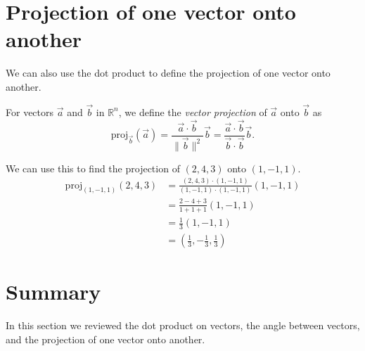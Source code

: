 \documentclass{ximera}
\begin{document}
\section{Projection of one vector onto another}

We can also use the dot product to define the projection of one vector onto another.

\begin{definition}
For vectors $\vec{a}$ and $\vec{b}$ in $\mathbb{R}^n$, we define the \emph{vector projection} of $\vec{a}$ onto $\vec{b}$ as
\[
\textrm{proj}_{\vec{b}}(\vec{a}) = \frac{\vec{a}\cdot\vec{b}}{\|\vec{b}\|^2}\vec{b}  = \frac{\vec{a}\cdot\vec{b}}{\vec{b}\cdot\vec{b}}\vec{b}.
\]
\end{definition}

\begin{example}
We can use this to find the projection of $(2,4,3)$ onto $(1,-1,1)$.
\begin{align*}
\textrm{proj}_{(1,-1,1)}(2,4,3) &= \frac{(2,4,3)\cdot(1,-1,1)}{(1,-1,1)\cdot(1,-1,1)}(1,-1,1)\\
&= \frac{2-4+3}{1+1+1}(1,-1,1)\\
&= \frac{1}{3}(1,-1,1)\\
&= \left( \frac{1}{3},-\frac{1}{3}, \frac{1}{3}\right)
\end{align*}
\end{example}

\section{Summary}

In this section we reviewed the dot product on vectors, the angle between vectors, and the projection of one vector onto another.
\end{document}
